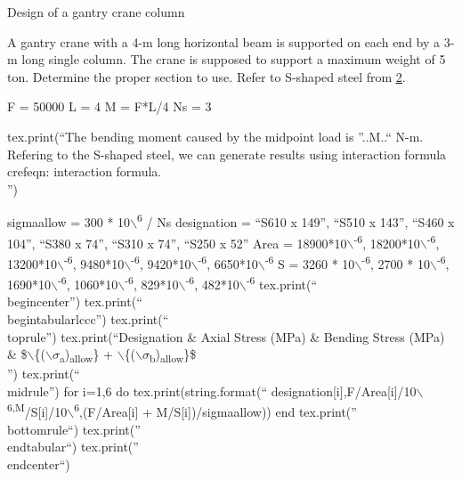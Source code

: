 \documentclass[a4paper,openany,12pt]{book}
\begin{document}
{{\begin{enumerate}
Design of a gantry crane column

A gantry crane with a 4-m long horizontal beam is supported on each end
by a 3-m long single column. The crane is supposed to support a maximum
weight of 5 ton. Determine the proper section to use. Refer to S-shaped
steel from \hyperref[appendix: structural steel properties]{2}.

F = 50000 L = 4 M = F*L/4 Ns = 3

tex.print(``The bending moment caused by the midpoint load is ''..M..``
N-m. Refering to the S-shaped steel, we can generate results using
interaction formula\\
crefeqn: interaction formula.\\

'')

sigmaallow = 300 * 10$\backslash$\textsuperscript{6} / Ns designation = ``S610 x 149'', ``S510 x 143'',
``S460 x 104'', ``S380 x 74'', ``S310 x 74'', ``S250 x 52'' Area = 18900*10$\backslash$\textsuperscript{-6},
18200*10$\backslash$\textsuperscript{-6}, 13200*10$\backslash$\textsuperscript{-6}, 9480*10$\backslash$\textsuperscript{-6}, 9420*10$\backslash$\textsuperscript{-6}, 6650*10$\backslash$\textsuperscript{-6} S =
3260 * 10$\backslash$\textsuperscript{-6}, 2700 * 10$\backslash$\textsuperscript{-6}, 1690*10$\backslash$\textsuperscript{-6}, 1060*10$\backslash$\textsuperscript{-6}, 829*10$\backslash$\textsuperscript{-6},
482*10$\backslash$\textsuperscript{-6} tex.print(``\\
begincenter'') tex.print(``\\
begintabularlccc'') tex.print(``\\
toprule'') tex.print(``Designation \& Axial Stress (MPa) \& Bending Stress
(MPa) \&
\$$\backslash$\{($\backslash$\(\sigma\)\textsubscript{a})\textsubscript{allow}\} + $\backslash$\{($\backslash$\(\sigma\)\textsubscript{b})\textsubscript{allow}\}\$\\

'') tex.print(``\\
midrule'') for i=1,6 do tex.print(string.format(``
designation[i],F/Area[i]/10$\backslash$\textsuperscript{6,M}/S[i]/10$\backslash$\textsuperscript{6},(F/Area[i] +
M/S[i])/sigmaallow)) end tex.print(''\\
bottomrule``) tex.print(''\\
endtabular``) tex.print(''\\
endcenter``)


\end{enumerate}}}
\end{document}
